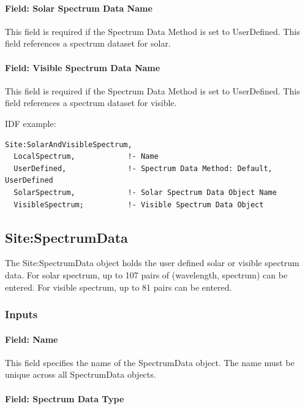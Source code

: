 \paragraph{Field: Solar Spectrum Data Name}\label{field-solar-spectrum-data-name}

This field is required if the Spectrum Data Method is set to UserDefined. This field references a spectrum dataset for solar.

\paragraph{Field: Visible Spectrum Data Name}\label{field-visible-spectrum-data-name}

This field is required if the Spectrum Data Method is set to UserDefined. This field references a spectrum dataset for visible.

IDF example:

\begin{lstlisting}
Site:SolarAndVisibleSpectrum,
  LocalSpectrum,            !- Name
  UserDefined,              !- Spectrum Data Method: Default, UserDefined
  SolarSpectrum,            !- Solar Spectrum Data Object Name
  VisibleSpectrum;          !- Visible Spectrum Data Object
\end{lstlisting}

\subsection{Site:SpectrumData}\label{sitespectrumdata}

The Site:SpectrumData object holds the user defined solar or visible spectrum data. For solar spectrum, up to 107 pairs of (wavelength, spectrum) can be entered. For visible spectrum, up to 81 pairs can be entered.

\subsubsection{Inputs}\label{inputs-25-001}

\paragraph{Field: Name}\label{field-name-11-007}

This field specifies the name of the SpectrumData object. The name must be unique across all SpectrumData objects.

\paragraph{Field: Spectrum Data Type}\label{field-spectrum-data-type}

